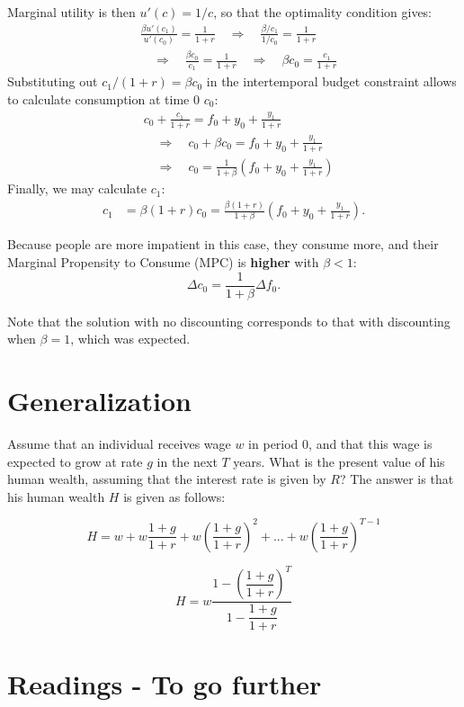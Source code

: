 \documentclass[]{book}
\theoremstyle{definition}
\theoremstyle{definition}
\theoremstyle{definition}
\theoremstyle{remark}
\begin{document}
Marginal utility is then \(u'(c)=1/c\), so that the optimality condition
gives: \[
\begin{aligned}
& \frac{\beta u'(c_{1})}{u'(c_{0})}=\frac{1}{1+r} \quad \Rightarrow \quad \frac{\beta/c_1}{1/c_0}=\frac{1}{1+r} \\
& \quad \Rightarrow \quad \frac{\beta c_0}{c_1}=\frac{1}{1+r} \quad \Rightarrow \quad \beta c_{0}=\frac{c_{1}}{1+r}
\end{aligned}
\] Substituting out \(c_{1}/(1+r)=\beta c_0\) in the intertemporal
budget constraint allows to calculate consumption at time \(0\) \(c_0\):
\[
\begin{aligned}
&c_{0}+\frac{c_{1}}{1+r}=f_{0}+y_{0}+\frac{y_{1}}{1+r}\\
&\quad \Rightarrow \quad c_{0}+\beta c_0=f_{0}+y_{0}+\frac{y_{1}}{1+r}\\
&\quad \Rightarrow \quad c_{0}=\frac{1}{1+\beta}\left(f_{0}+y_{0}+\frac{y_{1}}{1+r}\right)
\end{aligned}
\] Finally, we may calculate \(c_1\): \[
\begin{aligned}
c_{1}&=\beta (1+r)c_0=\frac{\beta(1+r)}{1+\beta}\left(f_{0}+y_{0}+\frac{y_{1}}{1+r}\right).
\end{aligned}
\]

Because people are more impatient in this case, they consume more, and
their Marginal Propensity to Consume (MPC) is \textbf{higher} with
\(\beta<1\): \[\Delta c_0 = \frac{1}{1+\beta}\Delta f_0.\]

Note that the solution with no discounting corresponds to that with
discounting when \(\beta=1\), which was expected.

\section{Generalization}\label{generalization}

Assume that an individual receives wage \(w\) in period \(0\), and that
this wage is expected to grow at rate \(g\) in the next \(T\) years.
What is the present value of his human wealth, assuming that the
interest rate is given by \(R\)? The answer is that his human wealth
\(H\) is given as follows:

\[H =w+w\frac{1+g}{1+r}+w\left(\frac{1+g}{1+r}\right)^{2}+...+w\left(\frac{1+g}{1+r}\right)^{T-1}\]

\[H =w\frac{1-\left(\dfrac{1+g}{1+r}\right)^{T}}{1-\dfrac{1+g}{1+r}}\]

\section*{Readings - To go further}\label{readings---to-go-further-2}
\end{document}

